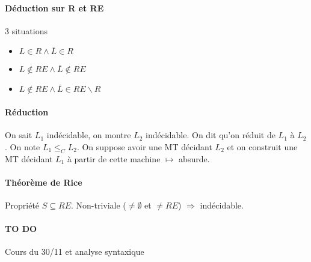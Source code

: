 \documentclass[french]{article}
\begin{document}
\paragraph{Déduction sur R et RE}
3 situations \begin{itemize}
\item $L\in R\wedge \bar{L}\in R$
\item $L\not\in RE\wedge\bar{L}\not\in RE$
\item $L\not\in RE\wedge\bar{L}\in RE\backslash R$
\end{itemize} 

\paragraph{Réduction}
On sait $L_1$ indécidable, on montre $L_2$ indécidable. On dit qu'on réduit de $L_1$ à $L_2$. On note $L_1\leq_C L_2$. On suppose avoir une MT décidant $L_2$ et on construit une MT décidant $L_1$ à partir de cette machine $\mapsto$ absurde.

\paragraph{Théorème de Rice}
Propriété $S\subseteq RE$. Non-triviale ($\neq\emptyset$ et $\neq RE$) $\Rightarrow$ indécidable.


\paragraph{TO DO}
Cours du 30/11 et analyse syntaxique
\end{document}
